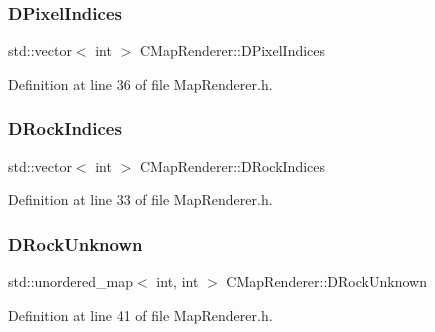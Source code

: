 \hypertarget{classCMapRenderer_af636936c20248c3ee6cb6ec46f18f077}{}\label{classCMapRenderer_af636936c20248c3ee6cb6ec46f18f077} 
\subsubsection{\texorpdfstring{D\+Pixel\+Indices}{DPixelIndices}}
{\footnotesize\ttfamily std\+::vector$<$ int $>$ C\+Map\+Renderer\+::\+D\+Pixel\+Indices\hspace{0.3cm}{\ttfamily [protected]}}



Definition at line 36 of file Map\+Renderer.\+h.

\hypertarget{classCMapRenderer_ac9178a9c9d30ac44aed7d324c51164a4}{}\label{classCMapRenderer_ac9178a9c9d30ac44aed7d324c51164a4} 
\subsubsection{\texorpdfstring{D\+Rock\+Indices}{DRockIndices}}
{\footnotesize\ttfamily std\+::vector$<$ int $>$ C\+Map\+Renderer\+::\+D\+Rock\+Indices\hspace{0.3cm}{\ttfamily [protected]}}



Definition at line 33 of file Map\+Renderer.\+h.

\hypertarget{classCMapRenderer_a28aa9c33d5d2eeae0ef7c23e59712274}{}\label{classCMapRenderer_a28aa9c33d5d2eeae0ef7c23e59712274} 
\subsubsection{\texorpdfstring{D\+Rock\+Unknown}{DRockUnknown}}
{\footnotesize\ttfamily std\+::unordered\+\_\+map$<$ int, int $>$ C\+Map\+Renderer\+::\+D\+Rock\+Unknown\hspace{0.3cm}{\ttfamily [protected]}}



Definition at line 41 of file Map\+Renderer.\+h.

\hypertarget{classCMapRenderer_ace0648cba050b5e02431096edd15b836}{}\label{classCMapRenderer_ace0648cba050b5e02431096edd15b836} 
